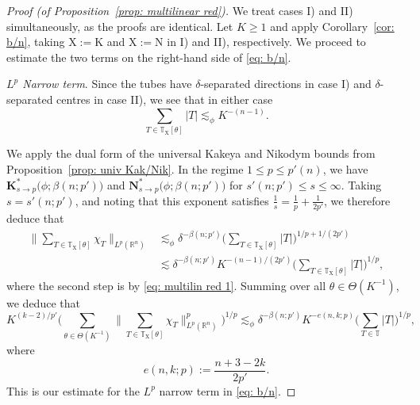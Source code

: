 \documentclass[reqno]{amsart}
\numberwithin{equation}{section}
\newcommand{\R}{\mathbb{R}}
\newcommand{\T}{\mathbb{T}}
\newcommand{\bK}{\mathbf{K}}
\newcommand{\bN}{\mathbf{N}}
\theoremstyle{plain}
\theoremstyle{definition}
\begin{document}
\begin{proof}[Proof (of Proposition~\ref{prop: multilinear red})] We treat cases I) and II) simultaneously, as the proofs are identical. Let $K \geq 1$ and apply Corollary~\ref{cor: b/n}, taking $\mathrm{X} := \mathrm{K}$ and $\mathrm{X} := \mathrm{N}$ in I) and II), respectively. We proceed to estimate the two terms on the right-hand side of \eqref{eq: b/n}.\medskip

\noindent\textit{$L^p$ Narrow term}. Since the tubes have $\delta$-separated directions in case I) and $\delta$-separated centres in case II), we see that  in either case 
\begin{equation}\label{eq: multilin red 1}
  \sum_{T \in \T_{\mathrm{X}}[\theta]} |T| \lesssim_\phi K^{-(n-1)} . 
\end{equation}

We apply the dual form of the universal Kakeya and Nikodym bounds from Proposition~\ref{prop: univ Kak/Nik}. In the regime $1 \leq p \leq p'(n)$, we have $\bK_{s \to p}^*\big(\phi; \beta(n;p')\big)$ and $\bN_{s \to p}^*\big(\phi; \beta(n;p')\big)$ for $s'(n; p') \leq s \leq \infty$. Taking $s = s'(n; p')$, and noting that this exponent satisfies $\frac{1}{s} = \frac{1}{p} + \frac{1}{2p'}$, we therefore deduce that
\begin{align*}
    \big\|\sum_{T \in \T_{\mathrm{X}}[\theta]} \chi_T\big\|_{L^p(\R^n)} &\lesssim_\phi \delta^{-\beta(n;p')} \Big(\sum_{T \in \T_{\mathrm{X}}[\theta]} |T|\Big)^{1/p + 1/(2p')} \\
    &\lesssim \delta^{-\beta(n;p')} K^{-(n-1)/(2p')} \Big(\sum_{T \in \T_{\mathrm{X}}[\theta]} |T| \Big)^{1/p},
\end{align*}
where the second step is by \eqref{eq: multilin red 1}. 
Summing over all $\theta \in \Theta(K^{-1})$, we deduce that
\begin{equation}\label{eq: multilin red 2}
     K^{(k-2)/p'} \Big(\sum_{\theta \in \Theta(K^{-1})} \big\|\sum_{T \in \T_{\mathrm{X}}[\theta]} \chi_T\big\|_{L^p(\R^n)}^p \Big)^{1/p} \lesssim_\phi \delta^{-\beta(n;p')} K^{-e(n,k;p)} \Big(\sum_{T \in \T} |T| \Big)^{1/p},
\end{equation}
where 
\begin{equation}\label{eq: multilin red 3}
    e(n,k;p) := \frac{n+3 - 2k}{2p'}.
\end{equation}
This is our estimate for the $L^p$ narrow term in \eqref{eq: b/n}.\medskip



\end{proof}
\end{document}
